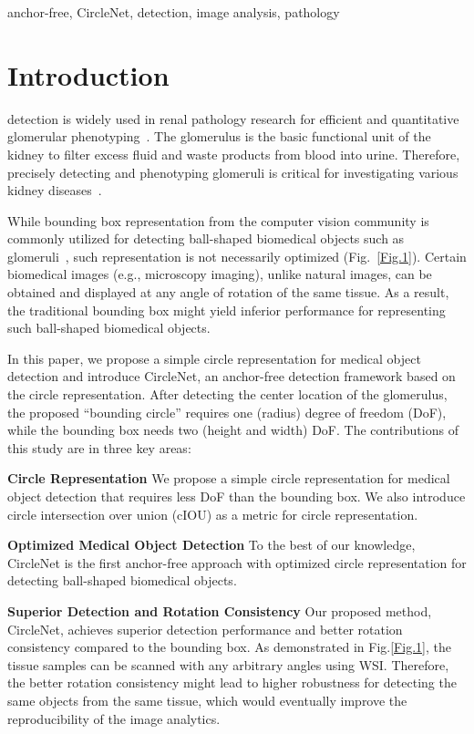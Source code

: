 \documentclass[journal]{IEEEtran}
\newcommand{\Fig}{Fig.}
\begin{document}
\begin{IEEEkeywords}
anchor-free, CircleNet, detection, image analysis, pathology
\end{IEEEkeywords}

\section{Introduction}
 detection is widely used in renal pathology research for efficient and quantitative glomerular phenotyping~\cite{huo2021ai}. The glomerulus is the basic functional unit of the kidney to filter excess fluid and waste products from blood into urine. Therefore, precisely detecting and phenotyping glomeruli is critical for investigating various kidney diseases~\cite{d2013rise}. 

While bounding box representation from the computer vision community is commonly utilized for detecting ball-shaped biomedical objects such as glomeruli~\cite{lo2018glomerulus, kawazoe2018faster, heckenauer2020real, rehem2021automatic}, such representation is not necessarily optimized (\Fig~\ref{Fig.1}). Certain biomedical images (e.g., microscopy imaging), unlike natural images, can be obtained and displayed at any angle of rotation of the same tissue. As a result, the traditional bounding box might yield inferior performance for representing such ball-shaped biomedical objects.

In this paper, we propose a simple circle representation for medical object detection and introduce CircleNet, an anchor-free detection framework based on the circle representation. After detecting the center location of the glomerulus, the proposed “bounding circle” requires one (radius) degree of freedom (DoF), while the bounding box needs two (height and width) DoF. The contributions of this study are in three key areas:

 \textbf{Circle Representation} We propose a simple circle representation for medical object detection that requires less DoF than the bounding box. We also introduce circle intersection over union (cIOU) as a metric for circle representation.

 \textbf{Optimized Medical Object Detection} To the best of our knowledge, CircleNet is the first anchor-free approach with optimized circle representation for detecting ball-shaped biomedical objects.  

 \textbf{Superior Detection and Rotation Consistency} Our proposed method, CircleNet, achieves superior detection performance and better rotation consistency compared to the bounding box. As demonstrated in \Fig \ref{Fig.1}, the tissue samples can be scanned with any arbitrary angles using WSI. Therefore, the better rotation consistency might lead to higher robustness for detecting the same objects from the same tissue, which would eventually improve the reproducibility of the image analytics. 
\end{document}
